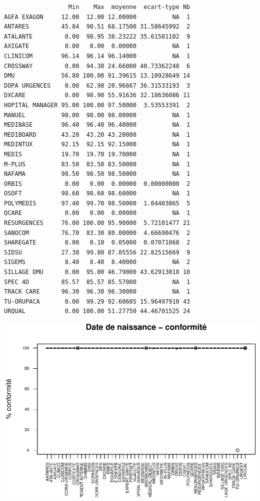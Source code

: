 \documentclass[]{article}
\begin{document}
\begin{verbatim}
                  Min    Max  moyenne  ecart-type Nb
AGFA EXAGON     12.00  12.00 12.00000          NA  1
ANTARES         45.84  90.51 68.17500 31.58645992  2
ATALANTE         0.00  98.95 38.23222 35.61581102  9
AXIGATE          0.00   0.00  0.00000          NA  1
CLINICOM        96.14  96.14 96.14000          NA  1
CROSSWAY         0.00  94.30 24.66000 40.73362248  6
DMU             56.80 100.00 91.39615 13.10928649 14
DOPA URGENCES    0.00  62.90 20.96667 36.31533193  3
DXCARE           0.00  98.90 55.91636 32.18636086 11
HOPITAL MANAGER 95.00 100.00 97.50000  3.53553391  2
MANUEL          98.00  98.00 98.00000          NA  1
MEDIBASE        96.40  96.40 96.40000          NA  1
MEDIBOARD       43.20  43.20 43.20000          NA  1
MEDINTUX        92.15  92.15 92.15000          NA  1
MEDIS           19.70  19.70 19.70000          NA  1
M-PLUS          83.50  83.50 83.50000          NA  1
NAFAMA          98.50  98.50 98.50000          NA  1
ORBIS            0.00   0.00  0.00000  0.00000000  2
OSOFT           98.60  98.60 98.60000          NA  1
POLYMEDIS       97.40  99.70 98.50000  1.04403065  5
QCARE            0.00   0.00  0.00000          NA  1
RESURGENCES     76.00 100.00 95.90000  5.72101477 21
SANOCOM         76.70  83.30 80.00000  4.66690476  2
SHAREGATE        0.00   0.10  0.05000  0.07071068  2
SIDSU           27.30  99.80 87.05556 22.82515669  9
SIGEMS           8.40   8.40  8.40000          NA  2
SILLAGE DMU      0.00  95.00 46.79000 43.62913018 10
SPEC 4D         85.57  85.57 85.57000          NA  1
TRACK CARE      96.30  96.30 96.30000          NA  1
TU-ORUPACA       0.00  99.29 92.60605 15.96497910 43
URQUAL           0.00 100.00 51.27750 44.46701525 24
\end{verbatim}

\includegraphics{septembre2015_files/figure-latex/unnamed-chunk-17-1.pdf}
\end{document}

